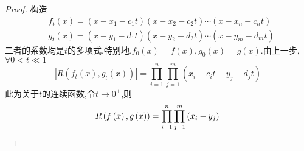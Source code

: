 {\begin{proof}
        构造
        \begin{align*}
             & f_t\left(x\right)=\left(
            x-x_1-c_1t
            \right)\left(
            x-x_2-c_2t
            \right)\cdots\left(
            x-x_n-c_nt
            \right)                     \\
             & g_t\left(x\right)=\left(
            x-y_1-d_1t
            \right)\left(
            x-y_2-d_2t
            \right)\cdots\left(
            x-y_m-d_mt
            \right)
        \end{align*}
        二者的系数均是$t$的多项式,特别地,$f_0\left(x\right)=f\left(x\right),g_0\left(x\right)=g\left(x\right)$.由上一步,$\forall 0<t\ll 1$
        \[
            \left|R\left(
            f_t\left(x\right),g_t\left(x\right)
            \right)\right|=\prod_{i=1}^{n}
            \prod_{j=1}^{m}
            \left(
            x_i+c_it-y_j-d_jt
            \right)
        \]
        此为关于$t$的连续函数,令$t\to 0^+$,则
        \[
            R\left(f\left(x\right),g\left(x\right)\right)=\prod_{i=1}^{n}
            \prod_{j=1}^{m}
            \left(
            x_i-y_j
            \right)\qedhere
        \]
    \end{proof}
}
